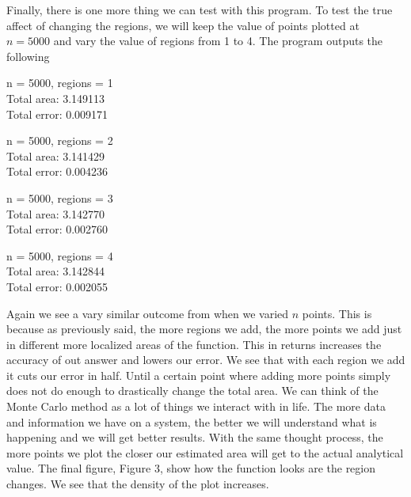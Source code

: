 \documentclass[12pt]{article}
\begin{document}
\newpage

Finally, there is one more thing we can test with this program. To test the true affect of changing the regions, we will keep the value of points plotted at $n = 5000$ and vary the value of regions from 1 to 4. The program outputs the following

\begin{center}
n = 5000, regions = 1 \\
Total area: 3.149113 \\
Total error: 0.009171 \\
\end{center}

\begin{center}
n = 5000, regions = 2 \\ 
Total area: 3.141429 \\
Total error: 0.004236 \\
\end{center}

\begin{center}
n = 5000, regions = 3 \\
Total area: 3.142770 \\
Total error: 0.002760 \\
\end{center}

\begin{center}
n = 5000, regions = 4 \\
Total area: 3.142844 \\
Total error: 0.002055 \\
\end{center}

Again we see a vary similar outcome from when we varied $n$ points. This is because as previously said, the more regions we add, the more points we add just in different more localized areas of the function. This in returns increases the accuracy of out answer and lowers our error. We see that with each region we add it cuts our error in half. Until a certain point where adding more points simply does not do enough to drastically change the total area. We can think of the Monte Carlo method as a lot of things we interact with in life. The more data and information we have on a system, the better we will understand what is happening and we will get better results. With the same thought process, the more points we plot the closer our estimated area will get to the actual analytical value. The final figure, Figure 3, show how the function looks are the region changes. We see that the density of the plot increases.
\end{document}
